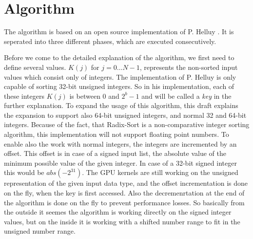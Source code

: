 \documentclass{llncs}
\title{\doctype}
\author{Hennadiy Yatskov\\ Nico Mürdter}
\institute{
Karlsruhe Institute of Technology, Karlsruhe, Germany\\
\email{hennadiy.yatskov@student.kit.edu\\ nico.muerdter@student.kit.edu}}
\begin{document}

\def\iterationcnt{5}

\maketitle

\begin{abstract}
TODO
\end{abstract}

\pagestyle{plain}

\section{Algorithm}
The algorithm is based on an open source implementation of P. Helluy \cite{ocl-radix-helluy}. It is seperated into three different phases, which are executed consecutively.

Before we come to the detailed explanation of the algorithm, we first need to define several values. $K(j)$ for $j=0 \dots N-1$, represents the non-sorted input values which consist only of integers. The implementation of P. Helluy is only capable of sorting 32-bit unsigned integers. So in his implementation, each of these integers $K(j)$ is between $0$ and $2^b - 1$ and will be called a \textit{key} in the further explanation. To expand the usage of this algorithm, this draft explains the expansion to support also 64-bit unsigned integers, and normal 32 and 64-bit integers. Because of the fact, that Radix-Sort is a non-comparative integer sorting algorithm, this implementation will not support floating point numbers. To enable also the work with normal integers, the integers are incremented by an offset. This offset is in case of a signed input list, the absolute value of the minimum possible value of the given integer. In case of a 32-bit signed integer this would be $abs(-2^{31})$. The GPU kernels are still working on the unsigned representation of the given input data type, and the offset incrementation is done on the fly, when the key is first accessed. Also the decremenrtation at the end of the algorithm is done on the fly to prevent performance losses. So basically from the outside it seemes the algorithm is working directly on the signed integer values, but on the inside it is working with a shifted number range to fit in the unsigned number range.
\end{document}
